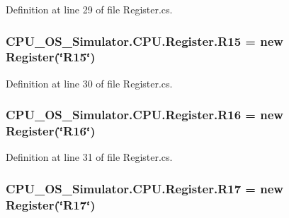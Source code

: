 Definition at line 29 of file Register.\+cs.

\hypertarget{class_c_p_u___o_s___simulator_1_1_c_p_u_1_1_register_a643aa109f6aea2e44a92aca9cd62b2df}{}
\subsubsection[{R15}]{ C\+P\+U\+\_\+\+O\+S\+\_\+\+Simulator.\+C\+P\+U.\+Register.\+R15 = new {\bf Register}(\char`\"{}R15\char`\"{})\hspace{0.3cm}{\ttfamily [static]}}\label{class_c_p_u___o_s___simulator_1_1_c_p_u_1_1_register_a643aa109f6aea2e44a92aca9cd62b2df}


Definition at line 30 of file Register.\+cs.

\hypertarget{class_c_p_u___o_s___simulator_1_1_c_p_u_1_1_register_ac008605898ab29a4ecd071f25f9e2d50}{}
\subsubsection[{R16}]{ C\+P\+U\+\_\+\+O\+S\+\_\+\+Simulator.\+C\+P\+U.\+Register.\+R16 = new {\bf Register}(\char`\"{}R16\char`\"{})\hspace{0.3cm}{\ttfamily [static]}}\label{class_c_p_u___o_s___simulator_1_1_c_p_u_1_1_register_ac008605898ab29a4ecd071f25f9e2d50}


Definition at line 31 of file Register.\+cs.

\hypertarget{class_c_p_u___o_s___simulator_1_1_c_p_u_1_1_register_add014a0021f9e8115728d7b95a398bda}{}
\subsubsection[{R17}]{ C\+P\+U\+\_\+\+O\+S\+\_\+\+Simulator.\+C\+P\+U.\+Register.\+R17 = new {\bf Register}(\char`\"{}R17\char`\"{})\hspace{0.3cm}{\ttfamily [static]}}\label{class_c_p_u___o_s___simulator_1_1_c_p_u_1_1_register_add014a0021f9e8115728d7b95a398bda}


